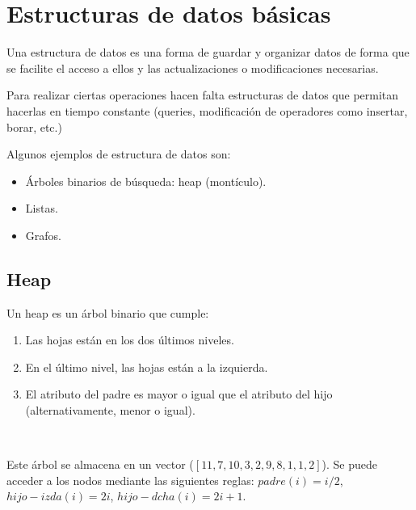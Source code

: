 \documentclass[AL.tex]{subfiles}
\begin{document}
\chapter{Estructuras de datos básicas}
Una estructura de datos es una forma de guardar y organizar datos de forma que se facilite el acceso a ellos y las actualizaciones o modificaciones necesarias.

Para realizar ciertas operaciones hacen falta estructuras de datos que permitan hacerlas en tiempo constante (queries, modificación de operadores como insertar, borar, etc.)

Algunos ejemplos de estructura de datos son:
\begin{itemize}
\item Árboles binarios de búsqueda: heap (montículo).
\item Listas.
\item Grafos. 
\end{itemize}

\section{Heap}
Un heap es un árbol binario que cumple:
\begin{enumerate}
\item Las hojas están en los dos últimos niveles.
\item En el último nivel, las hojas están a la izquierda.
\item El atributo del padre es mayor o igual que el atributo del hijo (alternativamente, menor o igual). 
\end{enumerate}
\newpage
\begin{ej}\



Este árbol se almacena en un vector ($[11,7,10,3,2,9,8,1,1,2]$). Se puede acceder a los nodos mediante las siguientes reglas: $padre(i)=i/2$, $hijo-izda(i)=2i$, $hijo-dcha(i)=2i+1$.
\end{ej}
\end{document}
